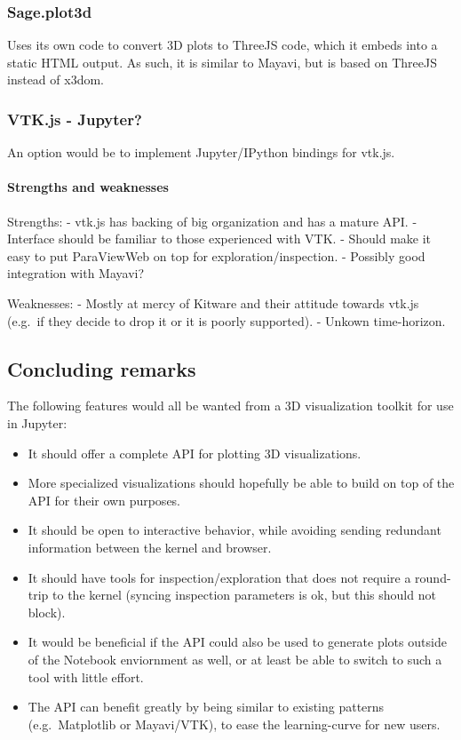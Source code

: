     \hypertarget{sage.plot3d}{%
\subsubsection{Sage.plot3d}\label{sage.plot3d}}

Uses its own code to convert 3D plots to ThreeJS code, which it embeds
into a static HTML output. As such, it is similar to Mayavi, but is
based on ThreeJS instead of x3dom.

    \hypertarget{vtk.js---jupyter}{%
\subsubsection{VTK.js - Jupyter?}\label{vtk.js---jupyter}}

An option would be to implement Jupyter/IPython bindings for vtk.js.

\hypertarget{strengths-and-weaknesses}{%
\paragraph{Strengths and
weaknesses}\label{strengths-and-weaknesses}}

Strengths: - vtk.js has backing of big organization and has a mature
API. - Interface should be familiar to those experienced with VTK. -
Should make it easy to put ParaViewWeb on top for
exploration/inspection. - Possibly good integration with Mayavi?

Weaknesses: - Mostly at mercy of Kitware and their attitude towards
vtk.js (e.g.~if they decide to drop it or it is poorly supported). -
Unkown time-horizon.

    \hypertarget{concluding-remarks}{%
\subsection{Concluding remarks}\label{concluding-remarks}}

The following features would all be wanted from a 3D visualization
toolkit for use in Jupyter:

\begin{itemize}
\tightlist
\item
  It should offer a complete API for plotting 3D visualizations.
\item
  More specialized visualizations should hopefully be able to build on
  top of the API for their own purposes.
\item
  It should be open to interactive behavior, while avoiding sending
  redundant information between the kernel and browser.
\item
  It should have tools for inspection/exploration that does not require
  a round-trip to the kernel (syncing inspection parameters is ok, but
  this should not block).
\item
  It would be beneficial if the API could also be used to generate plots
  outside of the Notebook enviornment as well, or at least be able to
  switch to such a tool with little effort.
\item
  The API can benefit greatly by being similar to existing patterns
  (e.g.~Matplotlib or Mayavi/VTK), to ease the learning-curve for new
  users.
\end{itemize}

